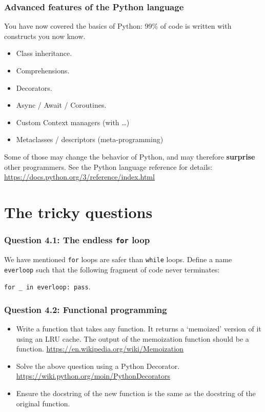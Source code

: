 \documentclass{beamer} %
\newcommand\emc[1]{\textcolor{brightblue}{\textbf{#1}}}
\begin{document}
\begin{frame}

\frametitle{Advanced features of the Python language}

You have now covered the basics of Python: 99\% of code is written with constructs you now know.
\begin{itemize}
  \item Class inheritance.
  \item Comprehensions.
  \item Decorators.
  \item Async / Await / Coroutines.
  \item Custom Context managers (with \ldots)
  \item Metaclasses / descriptors (meta-programming)
\end{itemize}
Some of those may change the behavior of Python, and may therefore \emc{surprise} other programmers. See the Python language reference for details: \url{https://docs.python.org/3/reference/index.html}

\end{frame}

\section{The tricky questions}

\begin{frame}

\frametitle{Question 4.1: The endless \texttt{for} loop}

We have mentioned \texttt{for} loops are safer than \texttt{while} loops. Define a name \texttt{everloop} such that the following fragment of code never terminates: 

\texttt{for \_ in everloop: pass}.

\end{frame}

\begin{frame}

\frametitle{Question 4.2: Functional programming}

\begin{itemize}
\item Write a function that takes any function. It returns a `memoized' version of it using an LRU cache. The output of the memoization function should be a function. \url{https://en.wikipedia.org/wiki/Memoization}
\item Solve the above question using a Python Decorator. \url{https://wiki.python.org/moin/PythonDecorators}
\item Ensure the docstring of the new function is the same as the docstring of the original function.
\end{itemize}

\end{frame}
 

\end{document}
